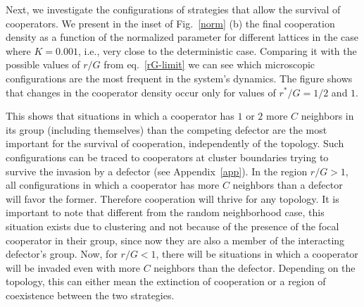 \documentclass[5p,review]{elsarticle}
\begin{document}
Next, we investigate the configurations of strategies that allow the survival of cooperators. 
%
We present in the inset of Fig.~\ref{norm} (b) the final cooperation density as a function of the normalized parameter for different lattices in the case where $K=0.001$, i.e., very close to the deterministic case. Comparing it with the possible values of $r/G$ from eq.~\ref{rG-limit}  we can see which microscopic configurations are the most frequent in the system's dynamics.
%
The figure shows that changes in the cooperator density occur only for values of $r^*/G=1/2$ and $1$. 

This shows that situations in which a cooperator has $1$ or $2$ more $C$ neighbors in its group (including themselves) than the competing defector are the most important for the survival of cooperation, independently of the topology.
%
Such configurations can be traced to cooperators at cluster boundaries trying to survive the invasion by a defector (see Appendix~\ref{app}). 
%
In the region $r/G>1$,  all configurations in which a cooperator has more $C$ neighbors than a defector will favor the former. Therefore cooperation will thrive for any topology.
%
It is important to note that different from the random neighborhood case, this situation exists due to clustering and not because of the presence of the focal cooperator in their group, since now they are also a member of the interacting defector's group.
%
Now, for $r/G<1$, there will be situations in which a cooperator will be invaded even with more $C$ neighbors than the defector.  
%
Depending on the topology, this can either mean the extinction of cooperation or a region of coexistence between the two strategies. 
%
\end{document}
